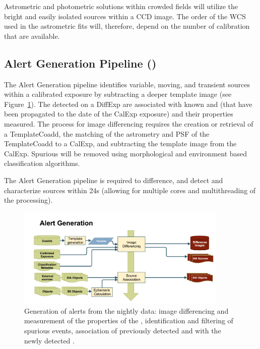 Astrometric and photometric solutions  within crowded fields will utilize the bright and easily isolated sources within a CCD image. The order of the WCS used in the astrometric fits will, therefore, depend on the number of calibration \Sources that are available.

\subsection{Alert Generation Pipeline (\wbsDiffim)}
\label{sec:apAlertGeneration}

The Alert Generation pipeline identifies variable, moving, and transient sources within a calibrated exposure by subtracting a deeper template image (see Figure~\ref{fig:apAlertgen}). The \DIASources detected on a DiffExp are associated with known \DIAObjects and \SSObjects (that have been propagated to the date of the CalExp exposure) and their properties measured. The process for image differencing requires the creation or retrieval of a TemplateCoadd, the matching of the  astrometry and PSF of the TemplateCoadd to a CalExp, and subtracting the template image from the CalExp. Spurious \DIASources will be removed using morphological and environment based classification algorithms. 

The Alert Generation pipeline is required to difference, and detect and characterize \DIASource sources within 24s (allowing for multiple cores and multithreading of the processing). 


\begin{figure}[th]
\begin{center}
\includegraphics[width=0.9\textwidth]{figures/Alert_Generation.png}
\caption{\label{fig:apAlertgen} Generation of alerts from the nightly data: image differencing and measurement of the properties of the \DIASources, identification and filtering of spurious events, association of previously detected \DIAObjects and \SSObjects with the newly detected \DIASources. }
\end{center}
\end{figure} 
